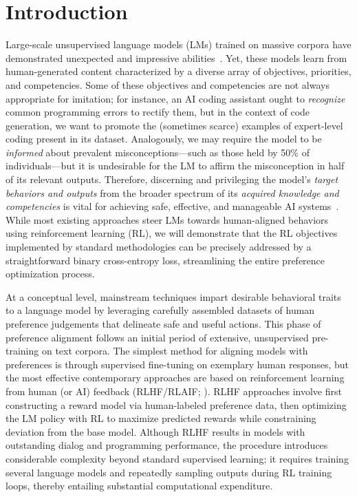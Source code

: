 \section{Introduction}
Large-scale unsupervised language models (LMs) trained on massive corpora have demonstrated unexpected and impressive abilities~\citep{chowdhery2022palm, brown2020language, touvron2023llama,bubeck2023sparks}. Yet, these models learn from human-generated content characterized by a diverse array of objectives, priorities, and competencies. Some of these objectives and competencies are not always appropriate for imitation; for instance, an AI coding assistant ought to \textit{recognize} common programming errors to rectify them, but in the context of code generation, we want to promote the (sometimes scarce) examples of expert-level coding present in its dataset. Analogously, we may require the model to be \textit{informed} about prevalent misconceptions—such as those held by 50\% of individuals—but it is undesirable for the LM to affirm the misconception in half of its relevant outputs. Therefore, discerning and privileging the model's \emph{target behaviors and outputs} from the broader spectrum of its \textit{acquired knowledge and competencies} is vital for achieving safe, effective, and manageable AI systems~\citep{ouyang2022training}. While most existing approaches steer LMs towards human-aligned behaviors using reinforcement learning (RL), we will demonstrate that the RL objectives implemented by standard methodologies can be precisely addressed by a straightforward binary cross-entropy loss, streamlining the entire preference optimization process.

At a conceptual level, mainstream techniques impart desirable behavioral traits to a language model by leveraging carefully assembled datasets of human preference judgements that delineate safe and useful actions. This phase of preference alignment follows an initial period of extensive, unsupervised pre-training on text corpora. The simplest method for aligning models with preferences is through supervised fine-tuning on exemplary human responses, but the most effective contemporary approaches are based on reinforcement learning from human (or AI) feedback (RLHF/RLAIF; \citep{christiano2017deep,bai2022constitutional}). RLHF approaches involve first constructing a reward model via human-labeled preference data, then optimizing the LM policy with RL to maximize predicted rewards while constraining deviation from the base model. Although RLHF results in models with outstanding dialog and programming performance, the procedure introduces considerable complexity beyond standard supervised learning; it requires training several language models and repeatedly sampling outputs during RL training loops, thereby entailing substantial computational expenditure.

